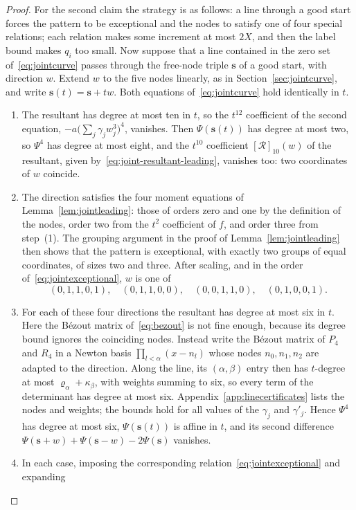 \documentclass[11pt]{article}
\theoremstyle{definition}
\theoremstyle{remark}
\begin{document}
\begin{proof}
For the second claim the strategy is as follows: a line through a good start
forces the pattern to be exceptional and the nodes to satisfy one of four
special relations; each relation makes some increment at most $2X$, and then
the label bound makes $q_i$ too small.
Now suppose that a line contained in the zero set of~\eqref{eq:jointcurve} passes
through the free-node triple $\mathbf s$ of a good start, with direction $w$. Extend $w$ to the five
nodes linearly, as in Section~\ref{sec:jointcurve}, and write $\mathbf s(t)=\mathbf s+tw$. Both equations
of~\eqref{eq:jointcurve} hold identically in $t$.
\begin{enumerate}
\item The resultant has degree at most ten in $t$, so the $t^{12}$ coefficient of the second
equation, $-a\bigl(\sum_j\gamma_jw_j^3\bigr)^4$, vanishes. Then $\Psi(\mathbf s(t))$ has degree at most
two, so $\Psi^4$ has degree at most eight, and the $t^{10}$ coefficient
$[\mathcal R]_{10}(w)$ of the resultant, given by~\eqref{eq:joint-resultant-leading}, vanishes
too: two coordinates of $w$ coincide.
\item The direction satisfies the four moment equations of Lemma~\ref{lem:jointleading}: those
of orders zero and one by the definition of the nodes, order two from the $t^2$ coefficient of
$f$, and order three from step~(1). The grouping argument in the proof of
Lemma~\ref{lem:jointleading} then shows that the pattern is exceptional, with exactly two
groups of equal coordinates, of sizes two and three. After scaling, and in the order
of~\eqref{eq:jointexceptional}, $w$ is one of
\[
 (0,1,1,0,1),\quad (0,1,1,0,0),\quad
 (0,0,1,1,0),\quad (0,1,0,0,1).
\]
\item For each of these four directions the resultant has degree at most six in $t$. Here the
B\'ezout matrix of~\eqref{eq:bezout} is not fine enough, because its degree bound ignores the
coinciding nodes. Instead write the B\'ezout matrix of $P_4$ and $R_4$ in a Newton basis
$\prod_{l<\alpha}(x-n_l)$ whose nodes $n_0,n_1,n_2$ are adapted to the direction. Along the
line, its $(\alpha,\beta)$ entry then has $t$-degree at most $\varrho_\alpha+\kappa_\beta$, with
weights summing to six, so every term of the determinant has degree at most six.
Appendix~\ref{app:linecertificates} lists the nodes and weights; the bounds hold for all values
of the $\gamma_j$ and $\gamma'_j$. Hence $\Psi^4$ has degree at most six, $\Psi(\mathbf s(t))$
is affine in $t$, and its second difference $\Psi(\mathbf s+w)+\Psi(\mathbf s-w)-2\Psi(\mathbf s)$
vanishes.
\item In each case, imposing the corresponding relation~\eqref{eq:jointexceptional} and expanding

\end{enumerate}
\end{proof}
\end{document}
